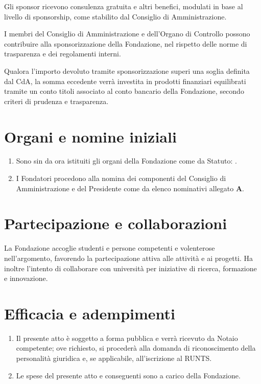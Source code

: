 Gli sponsor ricevono consulenza gratuita e altri benefici, modulati in base al livello di sponsorship, come stabilito dal Consiglio di Amministrazione.

I membri del Consiglio di Amministrazione e dell'Organo di Controllo possono contribuire alla sponsorizzazione della Fondazione, nel rispetto delle norme di trasparenza e dei regolamenti interni.

Qualora l'importo devoluto tramite sponsorizzazione superi una soglia definita dal CdA, la somma eccedente verrà investita in prodotti finanziari equilibrati tramite un conto titoli associato al conto bancario della Fondazione, secondo criteri di prudenza e trasparenza.

\section*{Organi e nomine iniziali}
\begin{enumerate}[label=\arabic*)]
  \item Sono sin da ora istituiti gli organi della Fondazione come da Statuto: \OrganiElenco.
  \item I Fondatori procedono alla nomina dei componenti del Consiglio di Amministrazione e del Presidente come da elenco nominativi allegato \textbf{A}.
\end{enumerate}

\section*{Partecipazione e collaborazioni}
La Fondazione accoglie studenti e persone competenti e volenterose nell’argomento, favorendo la partecipazione attiva alle attività e ai progetti. Ha inoltre l’intento di collaborare con università per iniziative di ricerca, formazione e innovazione.

\section*{Efficacia e adempimenti}
\begin{enumerate}[label=\arabic*)]
  \item Il presente atto è soggetto a forma pubblica e verrà ricevuto da Notaio competente; ove richiesto, si procederà alla domanda di riconoscimento della personalità giuridica e, se applicabile, all'iscrizione al RUNTS.
  \item Le spese del presente atto e conseguenti sono a carico della Fondazione.
\end{enumerate}

